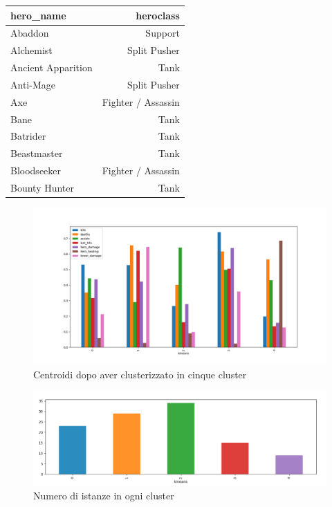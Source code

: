 \documentclass[a4paper,12pt,openany,oneside]{book}
\begin{document}
\begin{table}[!h]
	\scriptsize	
	\centering
	\begin{tabularx}{0.33\textwidth}{lr} 
		hero\_name  &    heroclass \\ 
		\midrule
		Abaddon  &      Support \\
		Alchemist  & Split Pusher \\
		Ancient Apparition  &         Tank \\
		Anti-Mage  & Split Pusher \\
		Axe  &      Fighter / Assassin \\
		Bane  &         Tank \\
		Batrider  &         Tank \\
		Beastmaster  &         Tank \\
		Bloodseeker  &      Fighter / Assassin \\
		Bounty Hunter  &         Tank \\
	\end{tabularx}
\end{table}

\begin{figure}
	\includegraphics[width=\linewidth]{pics/clustering_roles.png}
	\caption{Centroidi dopo aver clusterizzato in cinque cluster}
	\label{fig:clustering-roles}
\end{figure}

\begin{figure}
	\includegraphics[width=\linewidth]{pics/clustering_roles_n.png}
	\caption{Numero di istanze in ogni cluster}
	\label{fig:clustering-roles-n}
\end{figure}
\end{document}
